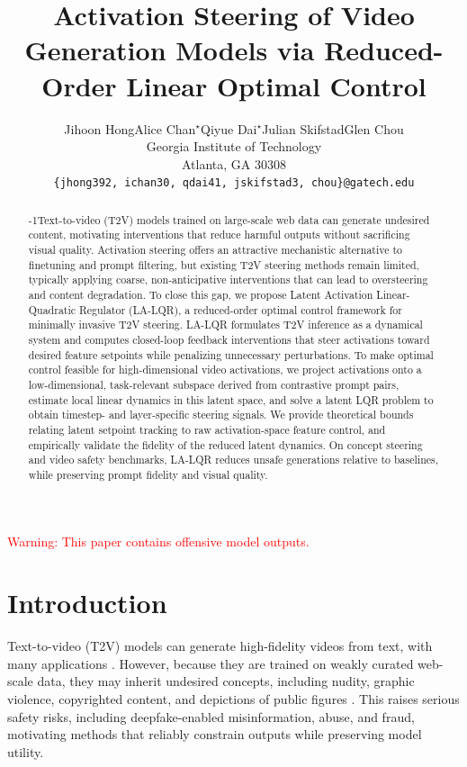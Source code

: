 \documentclass{article}
\title{Activation Steering of Video Generation Models via Reduced-Order Linear Optimal Control}
\author{%
  Jihoon Hong\qquad Alice Chan$^\star$\qquad Qiyue Dai$^\star$\qquad Julian Skifstad\qquad Glen Chou\\ %
  Georgia Institute of Technology\\
  Atlanta, GA 30308 \\
  \texttt{\{jhong392, ichan30, qdai41, jskifstad3, chou\}@gatech.edu} \\
}
\begin{document}
\maketitle

\begin{abstract}
\looseness-1Text-to-video (T2V) models trained on large-scale web data can generate undesired content, motivating interventions that reduce harmful outputs without sacrificing visual quality. Activation steering offers an attractive mechanistic alternative to finetuning and prompt filtering, but existing T2V steering methods remain limited, typically applying coarse, non-anticipative interventions that can lead to oversteering and content degradation. 
To close this gap, we propose Latent Activation Linear-Quadratic Regulator (LA-LQR), a reduced-order optimal control framework for minimally invasive T2V steering. LA-LQR formulates T2V inference as a dynamical system and computes closed-loop feedback interventions that steer activations toward desired feature setpoints while penalizing unnecessary perturbations. To make optimal control feasible for high-dimensional video activations, we project activations onto a low-dimensional, task-relevant subspace derived from contrastive prompt pairs, estimate local linear dynamics in this latent space, and solve a latent LQR problem to obtain timestep- and layer-specific steering signals. We provide theoretical bounds relating latent setpoint tracking to raw activation-space feature control, and empirically validate the fidelity of the reduced latent dynamics. On concept steering and video safety benchmarks, LA-LQR reduces unsafe generations relative to baselines, while preserving prompt fidelity and visual quality.
\end{abstract}

\begin{center}
\vspace{-5pt}
    \textcolor{red}{Warning: This paper contains offensive model outputs.}
\end{center}

\vspace{-15pt}
\section{Introduction}
\vspace{-5pt}

Text-to-video (T2V) models \cite{wan2025wan, ju2025editverse, zheng2024open, yang2024cogvideox, ho2022video} can generate high-fidelity videos from text, with many applications \cite{wu2025moviebench, he2026pre, kim2026cosmos}. However, because they are trained on weakly curated web-scale data, they may inherit undesired concepts, including nudity, graphic violence, copyrighted content, and depictions of public figures \cite{facchiano2025video, yoon2024safree}. This raises serious safety risks, including deepfake-enabled misinformation, abuse, and fraud, motivating methods that reliably constrain outputs while preserving model utility.
\end{document}
